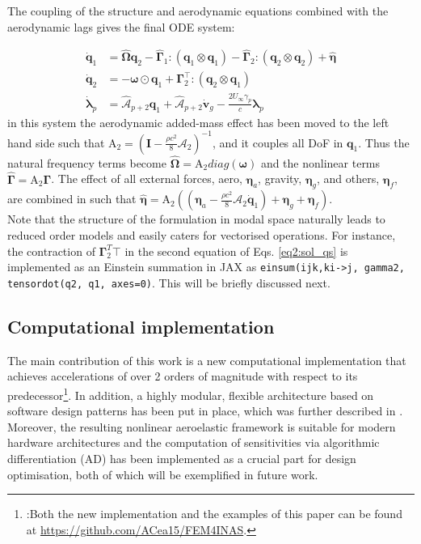 \documentclass[11pt]{article}
\begin{document}
The coupling of the structure and aerodynamic equations combined with the aerodynamic lags gives the final ODE system: 

\begin{equation}
\label{eq2:sol_qs}
\begin{split}
\dot{\pmb{q}}_{1} &=  \hat{\pmb{\Omega}}  \pmb{q}_{2} - \hat{\pmb{\Gamma}}_{1} \pmb{:} \left(\pmb{q}_{1} \otimes \pmb{q}_{1} \right) - \hat{\pmb{\Gamma}}_{2} \pmb{:} \left( \pmb{q}_{2} \otimes  \pmb{q}_{2} \right) + \hat{\bm{\eta}}  \\
\dot{\pmb{q}}_{2} &= -\pmb{\omega} \odot \pmb{q}_{1} + \pmb{\Gamma}_{2}^{\top} \pmb{:} \left( \pmb{q}_{2} \otimes  \pmb{q}_{1} \right) \\
\dot{\bm{\lambda}}_{p} &= \hat{\bm{\mathcal{A}}}_{p+2}\pmb{q}_{1}
                       + \hat{\bm{\mathcal{A}}}_{p+2}\dot{\pmb{v}}_g
                       -\frac{2U_\infty\gamma_p}{c}\bm{\lambda}_{p}
\end{split}
\end{equation}
in this system the aerodynamic added-mass effect has been moved to the left hand side such that \(\bm{\mathrm{A}}_2 = (\pmb{I} - \frac{\rho c^2}{8}\pmb{\mathcal{A}}_2)^{-1}\), and it couples all DoF in \(\pmb q_1\). Thus the natural frequency terms become \(\hat{\pmb{\Omega}} = \bm{\mathrm{A}}_2 diag(\pmb{\omega})\) and the nonlinear terms \(\hat{\pmb{\Gamma}} = \bm{\mathrm{A}}_2 \bm{\Gamma}\). The effect of all external forces, aero, \(\bm{\eta}_a\), gravity, \(\bm{\eta}_g\), and others, \(\bm{\eta}_f\), are combined in such that \(\hat{\bm{\eta}} = \bm{\mathrm{A}}_2 \left( \left( \bm{\eta}_a - \frac{\rho c^2}{8} \pmb{\mathcal{A}}_2\dot{\bm{q}}_1 \right) +  \bm{\eta}_g + \bm{\eta}_f \right)\). \\
Note that the structure of the formulation in modal space naturally leads to reduced order models and easily caters for vectorised operations. For instance, the contraction of \(\bm \Gamma_2^T{\top}\) in the second equation of Eqs. \ref{eq2:sol_qs} is implemented as an Einstein summation in JAX as \texttt{einsum(ijk,ki->j, gamma2, tensordot(q2, q1, axes=0)}. This will be briefly discussed next. 
\subsection{Computational implementation}
\label{sec:org7909629}
The main contribution of this work is a new computational implementation that achieves accelerations of over 2 orders of magnitude with respect to its predecessor\footnote{:Both the new implementation and the examples of this paper can be found at \url{https://github.com/ACea15/FEM4INAS}.}. In addition, a highly modular, flexible architecture based on software design patterns has been put in place, which was further described in \cite{CEA2024}. Moreover, the resulting nonlinear aeroelastic framework is suitable for modern hardware architectures and the computation of sensitivities via algorithmic differentiation (AD) has been implemented as a crucial part for design optimisation, both of which will be exemplified in future work.
\end{document}
